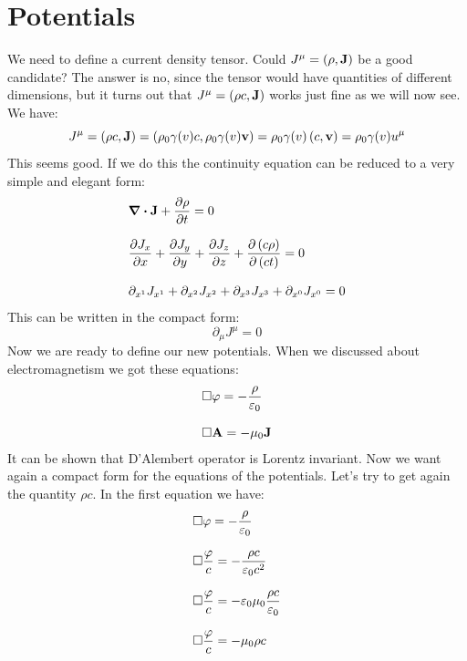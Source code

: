 \section{Potentials}
We need to define a current density tensor. Could $J^{\mu} = \left(\rho, \vb{J}\right)$ be a good candidate? The answer is no, since the tensor would have quantities of different dimensions, but it turns out that $J^{\mu} = \left(\rho c, \vb{J}\right)$ works just fine as we will now see.\\
We have:
\begin{equation}
  J^{\mu} = \left(\rho c, \vb{J}\right) = \left(\rho_0 \gamma(v) c, \rho_0 \gamma(v) \vb{v}\right) = \rho_0 \gamma(v)\left(c, \vb{v}\right) = \rho_0 \gamma(v)u^{\mu}
\end{equation}
This seems good. If we do this the continuity equation can be reduced to a very simple and elegant form:
\begin{equation}
  \begin{split}
    &\div{\vec{J}} + \pdv{\rho}{t} = 0 \\[8pt]
    &\pdv{J_x}{x} + \pdv{J_y}{y} + \pdv{J_z}{z} + \pdv{\brackets{c\rho}}{\brackets{ct}} = 0 \\[8pt]
    &\partial_{x^1}J_{x^1} + \partial_{x^2}J_{x^2} + \partial_{x^3}J_{x^3} + \partial_{x^0}J_{x^0} = 0
  \end{split}
\end{equation}
This can be written in the compact form:
\begin{equation}
  \boxed{\partial_{\mu}J^{\mu} = 0}
\end{equation}
Now we are ready to define our new potentials. When we discussed about electromagnetism we got these equations:
\begin{equation}
  \begin{split}
    &\square \varphi = -\dfrac{\rho}{\varepsilon_0}\\[8pt]
    &\square \vb{A} = -\mu_0 \vb{J}
  \end{split}
\end{equation}
It can be shown that D'Alembert operator is Lorentz invariant. Now we want again a compact form for the equations of the potentials. Let's try to get again the quantity $\rho c$. In the first equation we have:
\begin{equation}
  \begin{split}
    &\square \varphi = -\dfrac{\rho}{\varepsilon_0}\\[8pt]
    &\square \dfrac{\varphi}{c} = -\dfrac{\rho c}{\varepsilon_0 c^2}\\[8pt]
    &\square \dfrac{\varphi}{c} = -\varepsilon_0 \mu_0 \dfrac{\rho c}{\varepsilon_0}\\[8pt]
    &\square \dfrac{\varphi}{c} = -\mu_0 \rho c
  \end{split}
\end{equation}
